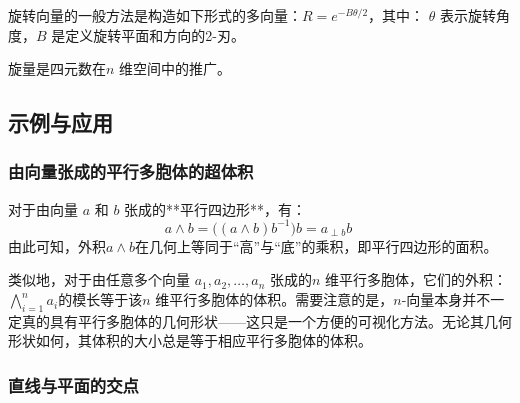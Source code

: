 旋转向量的一般方法是构造如下形式的多向量：$R = e^{-B\theta / 2}$，其中：
$\theta$ 表示旋转角度，$B$ 是定义旋转平面和方向的2-刃。

旋量是四元数在$n$ 维空间中的推广。
\subsection{示例与应用}
\subsubsection{由向量张成的平行多胞体的超体积}
对于由向量 $a$ 和 $b$ 张成的**平行四边形**，有：
$$
a \wedge b = \bigl((a \wedge b)b^{-1}\bigr)b = a_{\perp b} b~
$$
由此可知，外积$a \wedge b$在几何上等同于“高”与“底”的乘积，即平行四边形的面积。

类似地，对于由任意多个向量 $a_1, a_2, \ldots, a_n$ 张成的$n$ 维平行多胞体，它们的外积：$\bigwedge_{i=1}^n a_i$的模长等于该$n$ 维平行多胞体的体积。需要注意的是，$n$-向量本身并不一定真的具有平行多胞体的几何形状——这只是一个方便的可视化方法。无论其几何形状如何，其体积的大小总是等于相应平行多胞体的体积。
\subsubsection{直线与平面的交点}